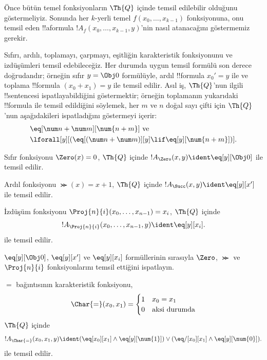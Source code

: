 \documentclass[../../../include/open-logic-section]{subfiles}
\begin{document}

Önce bütün temel fonksiyonların $\Th{Q}$ içinde temsil edilebilir olduğunu
göstermeliyiz. Sonunda her $k$-yerli temel $f(x_0,\dots,x_{k-1})$
fonksiyonuna, onu temsil eden !!a{formula}
$!A_f(x_0,\dots,x_{k-1},y)$'nin nasıl atanacağını göstermemiz gerekir.

Sıfırı, ardılı, toplamayı, çarpmayı, eşitliğin karakteristik fonksiyonunu ve
izdüşümleri temsil edebileceğiz. Her durumda uygun temsil formülü son derece
doğrudandır; örneğin sıfır $y=\Obj 0$ formülüyle, ardıl !!{formula}
$x_0'=y$ ile ve toplama !!{formula} $(x_0+x_1)=y$ ile temsil edilir. Asıl
iş, $\Th{Q}$'nun ilgili !!{sentence}s{}i ispatlayabildiğini göstermektir;
örneğin toplamanın yukarıdaki !!{formula} ile temsil edildiğini söylemek,
her $m$ ve $n$ doğal sayı çifti için $\Th{Q}$'nun aşağıdakileri ispatladığını
göstermeyi içerir:
\begin{align*}
& \eq[\num n + \num m][\num {n+m}] \text{ ve}\\
& \lforall[y][(\eq[(\num n + \num m)][y] \lif \eq[y][\num{n+m}])].
\end{align*}

\begin{prop}
Sıfır fonksiyonu $\Zero(x)=0$, $\Th{Q}$ içinde
$!A_{\Zero}(x,y) \ident \eq[y][\Obj 0]$ ile temsil edilir.
\end{prop}

\begin{prop}
Ardıl fonksiyonu $\Succ(x)=x+1$, $\Th{Q}$ içinde
$!A_{\Succ}(x,y) \ident \eq[y][x']$ ile temsil edilir.
\end{prop}

\begin{prop}
İzdüşüm fonksiyonu $\Proj{n}{i}(x_0, \dots, x_{n-1})=x_i$, $\Th{Q}$
içinde
\[!A_{\Proj{n}{i}}(x_0, \dots, x_{n-1}, y) \ident \eq[y][x_i].\]
ile temsil edilir.
\end{prop}

\begin{prob}
$\eq[y][\Obj 0]$, $\eq[y][x']$ ve $\eq[y][x_i]$ formüllerinin sırasıyla
$\Zero$, $\Succ$ ve $\Proj{n}{i}$ fonksiyonlarını temsil ettiğini ispatlayın.
\end{prob}

\begin{prop}
$=$ bağıntısının karakteristik fonksiyonu,
\[
\Char{=}(x_0, x_1) =
\begin{cases}
  1 & x_0 =x_1\\
  0 & \text{aksi durumda}
\end{cases}
\]
$\Th{Q}$ içinde
\[
  !A_{\Char{=}}(x_0, x_1, y) \ident (\eq[x_0][x_1] \land \eq[y][\num{1}]) \lor (\eq/[x_0][x_1] \land
\eq[y][\num{0}]).
\]
ile temsil edilir.
\end{prop}
\end{document}
